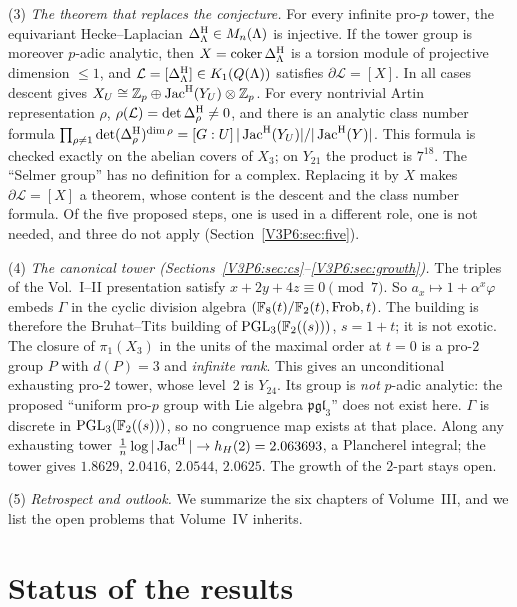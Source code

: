 \begin{chapterabstract}
(3) \emph{The theorem that replaces the conjecture.} For every infinite pro-$p$ tower, the
equivariant Hecke--Laplacian $\Delta^{\mathrm{H}}_\Lambda\in M_n(\Lambda)$ is injective. If the tower group is
moreover $p$-adic analytic, then $X=\operatorname{coker}\Delta^{\mathrm{H}}_\Lambda$ is a torsion module of projective
dimension $\le1$, and $\mathcal L=[\Delta^{\mathrm{H}}_\Lambda]\in K_1(Q(\Lambda))$ satisfies
$\partial\mathcal L=[X]$. In all cases descent gives $X_U\cong\mathbb{Z}_p\oplus\operatorname{Jac}^{\mathrm{H}}(Y_U)\otimes\mathbb{Z}_p$. For every
nontrivial Artin representation $\rho$, $\rho(\mathcal L)=\det\Delta^{\mathrm{H}}_\rho\neq0$, and there is
an analytic class number formula
$\prod_{\rho\ne1}\det(\Delta^{\mathrm{H}}_\rho)^{\dim\rho}=[G:U]\,|\operatorname{Jac}^{\mathrm{H}}(Y_U)|/|\operatorname{Jac}^{\mathrm{H}}(Y)|$. This formula is
checked exactly on the abelian covers of $X_3$; on $Y_{21}$ the product is $7^{18}$. The
``Selmer group'' has no definition for a complex. Replacing it by $X$ makes $\partial\mathcal
L=[X]$ a theorem, whose content is the descent and the class number formula. Of the five
proposed steps, one is used in a different role, one is not needed, and three do not apply
(Section~\ref{V3P6:sec:five}).

(4) \emph{The canonical tower (Sections~\ref{V3P6:sec:cs}--\ref{V3P6:sec:growth}).} The
triples of the Vol.~I--II presentation satisfy $x+2y+4z\equiv0\pmod7$. So $a_x\mapsto1+\alpha^{x}\varphi$
embeds $\Gamma$ in the cyclic division algebra $(\mathbb{F}_8(t)/\mathbb{F}_2(t),\mathrm{Frob},t)$. The building
is therefore the Bruhat--Tits building of $\mathrm{PGL}_3(\mathbb{F}_2((s)))$, $s=1+t$; it is not exotic. The
closure of $\pi_1(X_3)$ in the units of the maximal order at $t=0$ is a pro-$2$ group $P$ with
$d(P)=3$ and \emph{infinite rank}. This gives an unconditional exhausting pro-$2$ tower, whose
level~$2$ is $Y_{24}$. Its group is \emph{not} $p$-adic analytic: the proposed ``uniform pro-$p$
group with Lie algebra $\mathfrak{pgl}_3$'' does not exist here. $\Gamma$ is discrete in
$\mathrm{PGL}_3(\mathbb{F}_2((s)))$, so no congruence map exists at that place. Along any exhausting tower
$\frac1n\log|\operatorname{Jac}^{\mathrm{H}}|\to h_H(2)=2.063693$, a Plancherel integral; the tower gives $1.8629$,
$2.0416$, $2.0544$, $2.0625$. The growth of the $2$-part stays open.

(5) \emph{Retrospect and outlook.} We summarize the six chapters of Volume~III, and we list the
open problems that Volume~IV inherits.
\end{chapterabstract}

\section*{Status of the results}

